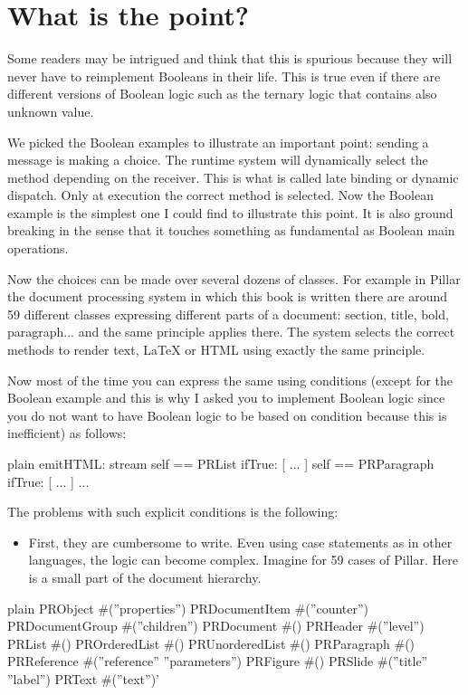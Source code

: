 \documentclass[10pt,twoside,english]{_support/latex/sbabook/sbabook}
\begin{document}
\section{What is the point?}
Some readers may be intrigued and think that this is spurious because they will never have to reimplement Booleans in their life. This is true even if there are different versions of Boolean logic such as the ternary logic that contains also unknown value. 

We picked the Boolean examples to illustrate an important point: sending a message is making a choice. The runtime system will dynamically select the method depending on the receiver. This is what is called late binding or dynamic dispatch. Only at execution the correct method is selected. Now the Boolean example is the simplest one I could find to illustrate this point. 
It is also ground breaking in the sense that it touches something as fundamental as Boolean main operations. 

Now the choices can be made over several dozens of classes. For example in Pillar the document processing system in which this book is written there are around 59 different classes expressing different parts of a document: section, title, bold, paragraph... and the same principle applies there. The system selects the correct methods to render text, LaTeX or HTML using exactly the same principle. 

Now most of the time you can express the same using conditions (except for the Boolean example and this is why I asked you to implement Boolean logic since you do not want to have Boolean logic to be based on condition because this is inefficient) as follows:

\begin{displaycode}{plain}
emitHTML: stream
	self == PRList
		ifTrue: [ ... ]
		self == PRParagraph 
			ifTrue: [ ... ]
			...
\end{displaycode}

The problems with such explicit conditions is the following: 

\begin{itemize}
\item First, they are cumbersome to write. Even using case statements as in other languages, the logic can become complex. Imagine for 59 cases of Pillar. Here is a small part of the document hierarchy. 
\end{itemize}

\begin{displaycode}{plain}
PRObject #(''properties'')
        PRDocumentItem #(''counter'')
                PRDocumentGroup #(''children'')
                        PRDocument #()
                        PRHeader #(''level'')
                        PRList #()
                                PROrderedList #()
                                PRUnorderedList #()
                        PRParagraph #()
                        PRReference #(''reference'' ''parameters'')
                                PRFigure #()
                        PRSlide #(''title'' ''label'')
                PRText #(''text'')'
\end{displaycode}
\end{document}
